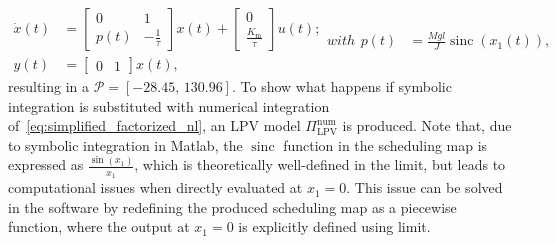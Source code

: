 \begin{subequations} \label{eq:unbalanced_LPV_auto}
    \begin{equation}
        \begin{aligned}
            \dot{x}(t) & = \begin{bmatrix}
                               0 & 1 \\ p(t) & -\frac{1}{\tau}
                           \end{bmatrix}x(t) + \begin{bmatrix}
                                                   0 \\ \frac{K_\mathrm{m}}{\tau}
                                               \end{bmatrix} u(t); \\
            y(t)       & = \begin{bmatrix}
                               0 & 1
                           \end{bmatrix} x(t),
        \end{aligned}
    \end{equation}
    with
    \begin{align}
        p(t) & = \frac{M g l}{J} \operatorname{sinc}(x_1(t)),
    \end{align}
\end{subequations}
resulting in a $\mathcal{P}=[-28.45, \, 130.96]$.
To show what happens if symbolic integration is substituted with numerical integration of~\eqref{eq:simplified_factorized_nl}, an LPV model $\Pi_\mathrm{LPV}^\mathrm{num}$ is produced. Note that, due to symbolic integration in Matlab, the $\operatorname{sinc}$ function in the scheduling map is expressed as $\frac{\sin(x_1)}{x_1}$, which is theoretically well-defined in the limit, but leads to computational issues when directly evaluated at $x_1 = 0$. This issue can be solved in the software by redefining the produced scheduling map as a piecewise function, where the output at $x_1 = 0$ is explicitly defined using limit.

